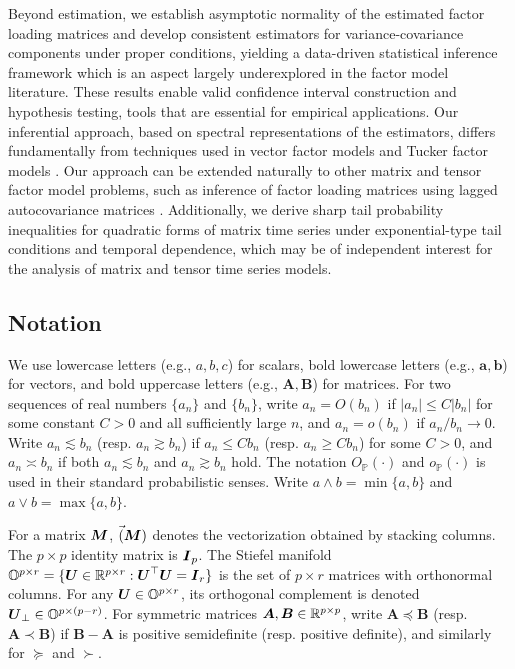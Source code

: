 \documentclass[11pt,letterpaper]{article}
\newcommand{\bfm}[1]{\ensuremath{\boldsymbol{#1}}} %
\def\ba{\bfm a}   \def\bA{\bfm A}  \def\AA{\mathbb{A}}
\def\bb{\bfm b}   \def\bB{\bfm B}  \def\BB{\mathbb{B}}
\theoremstyle{definition}
\begin{document}
Beyond estimation, we establish asymptotic normality of the estimated factor loading matrices and develop consistent estimators for variance-covariance components under proper conditions, yielding a data-driven statistical inference framework which is an aspect largely underexplored in the factor model literature. These results enable valid confidence interval construction and hypothesis testing, tools that are essential for empirical applications. Our inferential approach, based on spectral representations of the estimators, differs fundamentally from techniques used in vector factor models \citep{bai2003inferential} and Tucker factor models \citep{chen2023statistical, yu2022projected}. Our approach can be extended naturally to other matrix and tensor factor model problems, such as inference of factor loading matrices using lagged autocovariance matrices \citep{han2024tensor, chang2023modelling}. Additionally, we derive sharp tail probability inequalities for quadratic forms of matrix time series under exponential-type tail conditions and temporal dependence, which may be of independent interest for the analysis of matrix and tensor time series models.


\subsection{Notation}

We use lowercase letters (e.g., $a, b, c$) for scalars, bold lowercase letters (e.g., $\ba, \bb$) for vectors, and bold uppercase letters (e.g., $\bA, \bB$) for matrices. For two sequences of real numbers $\{a_n\}$ and $\{b_n\}$, write $a_n = O(b_n)$ if $|a_n| \le C|b_n|$ for some constant $C > 0$ and all sufficiently large $n$, and $a_n = o(b_n)$ if $a_n/b_n \to 0$. Write $a_n \lesssim b_n$ (resp. $a_n \gtrsim b_n$) if $a_n \le Cb_n$ (resp. $a_n \ge Cb_n$) for some $C > 0$, and $a_n \asymp b_n$ if both $a_n \lesssim b_n$ and $a_n \gtrsim b_n$ hold. The notation $O_{\mathbb{P}}(\cdot)$ and $o_{\mathbb{P}}(\cdot)$ is used in their standard probabilistic senses. Write $a \wedge b = \min\{a, b\}$ and $a \vee b = \max\{a, b\}$. %


For a matrix $\bM$, $\Vec(\bM)$ denotes the vectorization obtained by stacking columns. The $p \times p$ identity matrix is $\bI_p$. The Stiefel manifold $\OO^{p \times r} = \{\bU \in \RR^{p \times r} : \bU^{\top}\bU = \bI_{r}\}$ is the set of $p\times r$ matrices with orthonormal columns. For any $\bU \in \OO^{p\times r}$, its orthogonal complement is denoted $\bU_\perp \in \OO^{p \times (p-r)}$. For symmetric matrices $\bA, \bB \in \RR^{p \times p}$, write $\bA \preceq \bB$ (resp. $\bA \prec \bB$) if $\bB - \bA$ is positive semidefinite (resp. positive definite), and similarly for $\succeq$ and $\succ$.
\end{document}
